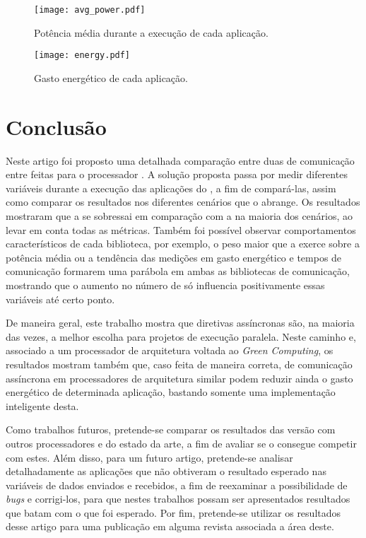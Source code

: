 \begin{figure}[h]
  \centering
  \caption{Potência média durante a execução de cada aplicação.}
  \label{fig:avgpower}
  \texttt{[image: avg\_power.pdf]}
\end{figure}

\clearpage

\begin{figure}[h]
  \centering
  \caption{Gasto energético de cada aplicação.}
  \label{fig:energy}
  \texttt{[image: energy.pdf]}
\end{figure}

\chapter{Conclusão}
\label{ch:conclusao}

Neste artigo foi proposto uma detalhada comparação entre duas \APIs de  comunicação entre \clusters feitas para o processador \mppa. A solução proposta passa por medir diferentes variáveis durante a execução das aplicações do \capb, a fim de compará-las, assim como comparar os resultados nos diferentes cenários que o \capb abrange.  Os resultados mostraram que a \API \ASYNC se sobressai em comparação com a \IPC na maioria dos cenários, ao levar em conta todas as métricas. Também foi possível observar comportamentos característicos de cada biblioteca, por exemplo, o peso maior que a \ASYNC exerce sobre a potência média ou a tendência das medições em gasto energético e tempos de comunicação formarem uma parábola em ambas as bibliotecas de comunicação, mostrando que o aumento no número de \clusters só influencia positivamente essas variáveis até certo ponto.

De maneira geral, este trabalho mostra que diretivas assíncronas são, na maioria das vezes, a melhor escolha para projetos de execução paralela. Neste caminho e, associado a um processador de arquitetura voltada ao \textit{Green Computing}, os resultados mostram também que, caso feita de maneira correta, \APIs de comunicação assíncrona em processadores de arquitetura similar podem reduzir ainda o gasto energético de determinada aplicação, bastando somente uma implementação inteligente desta.

Como trabalhos futuros, pretende-se comparar os resultados das versão \ASYNC com outros processadores \manycore e \multicore do estado da arte, a fim de avaliar se o \mppa consegue competir com estes. Além disso, para um futuro artigo, pretende-se analisar detalhadamente as aplicações \capb que não obtiveram o resultado esperado nas variáveis de dados enviados e recebidos, a fim de reexaminar a possibilidade de \textit{bugs} e corrigi-los, para que nestes trabalhos possam ser apresentados resultados que batam com o que foi esperado. Por fim, pretende-se utilizar os resultados desse artigo para uma publicação em alguma revista associada a área deste.

